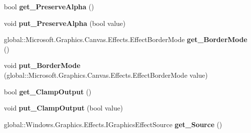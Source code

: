 \begin{DoxyCompactItemize}
bool {\bfseries get\+\_\+\+Preserve\+Alpha} ()
\item 
\mbox{\label{interface_microsoft_1_1_graphics_1_1_canvas_1_1_effects_1_1_i_convolve_matrix_effect_ae0c6993d4a292b01d732539a8675780f}} 
void {\bfseries put\+\_\+\+Preserve\+Alpha} (bool value)
\item 
\mbox{\label{interface_microsoft_1_1_graphics_1_1_canvas_1_1_effects_1_1_i_convolve_matrix_effect_affc8471c9cb7ddc40d4424d5f547f965}} 
global\+::\+Microsoft.\+Graphics.\+Canvas.\+Effects.\+Effect\+Border\+Mode {\bfseries get\+\_\+\+Border\+Mode} ()
\item 
\mbox{\label{interface_microsoft_1_1_graphics_1_1_canvas_1_1_effects_1_1_i_convolve_matrix_effect_af99f279c04d692c5fd026a935a236a97}} 
void {\bfseries put\+\_\+\+Border\+Mode} (global\+::\+Microsoft.\+Graphics.\+Canvas.\+Effects.\+Effect\+Border\+Mode value)
\item 
\mbox{\label{interface_microsoft_1_1_graphics_1_1_canvas_1_1_effects_1_1_i_convolve_matrix_effect_aefc08fc8fe409f44d6ab7b76799cc3e8}} 
bool {\bfseries get\+\_\+\+Clamp\+Output} ()
\item 
\mbox{\label{interface_microsoft_1_1_graphics_1_1_canvas_1_1_effects_1_1_i_convolve_matrix_effect_a0370614326a36da6fcf0fc7c69ba9ce2}} 
void {\bfseries put\+\_\+\+Clamp\+Output} (bool value)
\item 
\mbox{\label{interface_microsoft_1_1_graphics_1_1_canvas_1_1_effects_1_1_i_convolve_matrix_effect_a3db9cc0d5d797ce3307cc5f93aac58c3}} 
global\+::\+Windows.\+Graphics.\+Effects.\+I\+Graphics\+Effect\+Source {\bfseries get\+\_\+\+Source} ()
\item 
\mbox{\label{interface_microsoft_1_1_graphics_1_1_canvas_1_1_effects_1_1_i_convolve_matrix_effect_aa2e57e481287adea1356db1184a275e8}} 

\end{DoxyCompactItemize}
